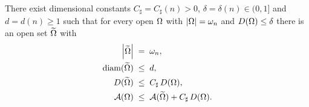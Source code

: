 \begin{lemma}\label{lem:truncation}
There exist dimensional constants $C_\sharp=C_\sharp(n)>0$,
$\delta=\delta(n)\in(0,1]$ and $d=d(n)\ge1$ such that for every open
$\Omega$ with $\left|\Omega\right|=\omega_n$ and $D(\Omega)\le\delta$ there is an open set
$\widetilde{\Omega}$ with
\begin{align}
   \left|\widetilde{\Omega}\right|\;&=\;\omega_n,\label{eq:trunc-vol}\\
   \operatorname{diam}(\widetilde{\Omega})\;&\le\;d,\label{eq:trunc-diam}\\
   D(\widetilde{\Omega})\;&\le\;C_\sharp\,D(\Omega),\label{eq:trunc-D}\\
   \mathcal A(\Omega)\;&\le\;\mathcal A(\widetilde{\Omega})+C_\sharp\,D(\Omega).\label{eq:trunc-A}
\end{align}
\end{lemma}

